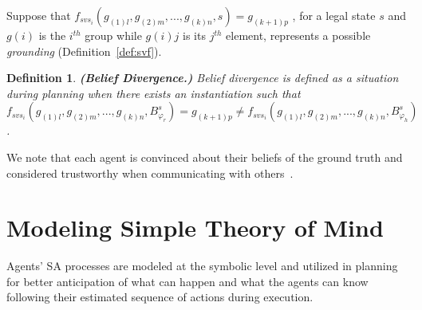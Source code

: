 \documentclass[letterpaper]{article} %
\newtheorem{definition}{Definition}
\begin{document}
Suppose that 
$f_{\textit{svs}_i}(g_{(1)l},g_{(2)m},...,g_{(k)n},s) = g_{(k+1)p}$
, for a legal state $s$ and $g(i)$ is the $i^{th}$ group while $g(i)j$ is its $j^{th}$ element, represents a possible {\em grounding} (Definition~\ref{def:svf}).

\begin{definition} \label{def:bd}
\textbf{(Belief Divergence.)}
Belief divergence is defined as a situation during planning when there exists an instantiation such that 
$f_{\textit{svs}_i}(g_{(1)l},g_{(2)m},...,g_{(k)n},B_{\varphi_r}^s) = {g_{(k+1)p}}  \neq f_{\textit{svs}_i}(g_{(1)l},g_{(2)m},...,g_{(k)n},B_{\varphi_h}^s)$.
\end{definition} 

We note that each agent is convinced about their beliefs of the ground truth and considered trustworthy when communicating with others~\cite{fabiano2021multi}.

\section{Modeling Simple Theory of Mind}
Agents' SA processes are modeled at the symbolic level and utilized in planning for better anticipation of what can happen and what the agents can know following their estimated sequence of actions during execution. 
\end{document}
